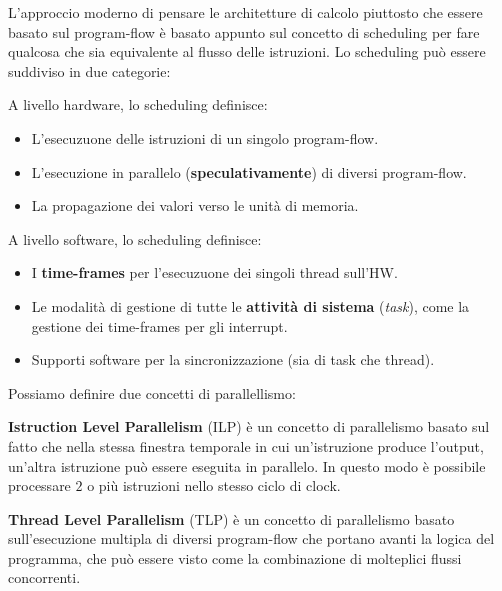 L'approccio moderno di pensare le architetture di calcolo piuttosto che essere basato sul program-flow è basato appunto sul concetto di scheduling per fare qualcosa che sia equivalente al flusso delle istruzioni. Lo scheduling può essere suddiviso in due categorie:
\begin{proposition}\label{prop:hw-sched}
    A livello hardware, lo scheduling definisce:
    \begin{itemize}
        \item L'esecuzuone delle istruzioni di un singolo program-flow.
        \item L'esecuzione in parallelo (\textbf{speculativamente}) di diversi program-flow.
        \item La propagazione dei valori verso le unità di memoria.
    \end{itemize}
\end{proposition}
\begin{proposition}\label{prop:sw-sched}
    A livello software, lo scheduling definisce:
    \begin{itemize}
        \item I \textbf{time-frames} per l'esecuzuone dei singoli thread sull'HW.
        \item Le modalità di gestione di tutte le \textbf{attività di sistema} (\textit{task}), come la gestione dei time-frames per gli interrupt.
        \item Supporti software per la sincronizzazione (sia di task che thread).
    \end{itemize}
\end{proposition}
Possiamo definire due concetti di parallellismo:
\begin{definition}\label{def:ilp}
    \textbf{Istruction Level Parallelism} (ILP) è un concetto di parallelismo basato sul fatto che nella stessa finestra temporale in cui un'istruzione produce l'output, un'altra istruzione può essere eseguita in parallelo.
    In questo modo è possibile processare $2$ o più istruzioni nello stesso ciclo di clock.
\end{definition}
\begin{definition}\label{def:tlp}
    \textbf{Thread Level Parallelism} (TLP) è un concetto di parallelismo basato sull'esecuzione multipla di diversi program-flow che portano avanti la logica del programma, che può essere visto come la combinazione di molteplici flussi concorrenti.
\end{definition}
